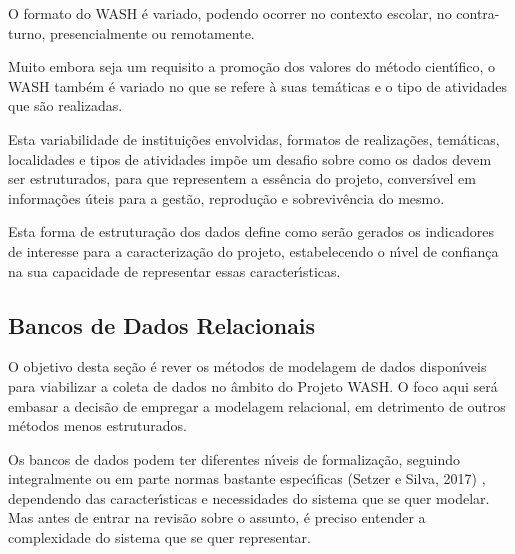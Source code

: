 \documentclass[
12pt,		%
openright,	%
twoside,  %
a4paper,			%
chapter=TITLE,		%
english,			%
french,				%
spanish,			%
brazil				%
]{USPSC-classe/USPSC_RedarTex}
\begin{document}
O formato do WASH \'e variado, podendo ocorrer no contexto escolar, no contra-turno, presencialmente ou remotamente.








Muito embora seja um requisito a promo\c{c}\~ao dos valores do m\'etodo cient\'{\i}fico, o WASH tamb\'em \'e variado no que se refere \`a suas tem\'aticas e o tipo de atividades que s\~ao realizadas.








Esta variabilidade de institui\c{c}\~oes envolvidas, formatos de realiza\c{c}\~oes, tem\'aticas, localidades e tipos de atividades imp\~oe um desafio sobre como os dados devem ser estruturados, para que representem a ess\^encia do projeto, convers\'{\i}vel em informa\c{c}\~oes \'uteis para a gest\~ao, reprodu\c{c}\~ao e sobreviv\^encia do mesmo.








Esta forma de estrutura\c{c}\~ao dos dados define como ser\~ao gerados os indicadores de interesse para a caracteriza\c{c}\~ao do projeto, estabelecendo o n\'{\i}vel de confian\c{c}a na sua capacidade de representar essas caracter\'{\i}sticas.








\subsection[Bancos de Dados Relacionais]{Bancos de Dados Relacionais}\label{Bancos de Dados Relacionais}
O objetivo desta se\c{c}\~ao \'e rever os m\'etodos de modelagem de dados dispon\'{\i}veis para viabilizar a coleta de dados no \^ambito do Projeto WASH. O foco aqui ser\'a embasar a decis\~ao de empregar a modelagem relacional, em detrimento de outros m\'etodos menos estruturados.








Os bancos de dados podem ter diferentes n\'{\i}veis de formaliza\c{c}\~ao, seguindo integralmente ou em parte normas bastante espec\'{\i}ficas (Setzer e Silva, 2017) , dependendo das caracter\'{\i}sticas e necessidades do sistema que se quer modelar. Mas antes de entrar na revis\~ao sobre o assunto, \'e preciso entender a complexidade do sistema que se quer representar.
\end{document}
